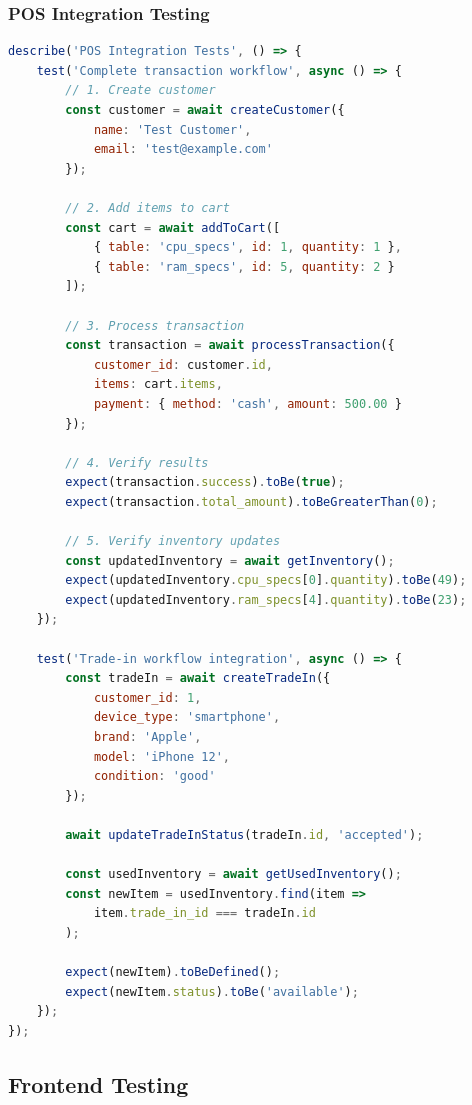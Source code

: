 \documentclass[12pt,a4paper]{article}
\begin{document}
\subsubsection{POS Integration Testing}
\begin{lstlisting}[language=javascript, caption=POS Integration Test Suite]
describe('POS Integration Tests', () => {
    test('Complete transaction workflow', async () => {
        // 1. Create customer
        const customer = await createCustomer({
            name: 'Test Customer',
            email: 'test@example.com'
        });
        
        // 2. Add items to cart
        const cart = await addToCart([
            { table: 'cpu_specs', id: 1, quantity: 1 },
            { table: 'ram_specs', id: 5, quantity: 2 }
        ]);
        
        // 3. Process transaction
        const transaction = await processTransaction({
            customer_id: customer.id,
            items: cart.items,
            payment: { method: 'cash', amount: 500.00 }
        });
        
        // 4. Verify results
        expect(transaction.success).toBe(true);
        expect(transaction.total_amount).toBeGreaterThan(0);
        
        // 5. Verify inventory updates
        const updatedInventory = await getInventory();
        expect(updatedInventory.cpu_specs[0].quantity).toBe(49);
        expect(updatedInventory.ram_specs[4].quantity).toBe(23);
    });
    
    test('Trade-in workflow integration', async () => {
        const tradeIn = await createTradeIn({
            customer_id: 1,
            device_type: 'smartphone',
            brand: 'Apple',
            model: 'iPhone 12',
            condition: 'good'
        });
        
        await updateTradeInStatus(tradeIn.id, 'accepted');
        
        const usedInventory = await getUsedInventory();
        const newItem = usedInventory.find(item => 
            item.trade_in_id === tradeIn.id
        );
        
        expect(newItem).toBeDefined();
        expect(newItem.status).toBe('available');
    });
});
\end{lstlisting}

\subsection{Frontend Testing}
\end{document}
